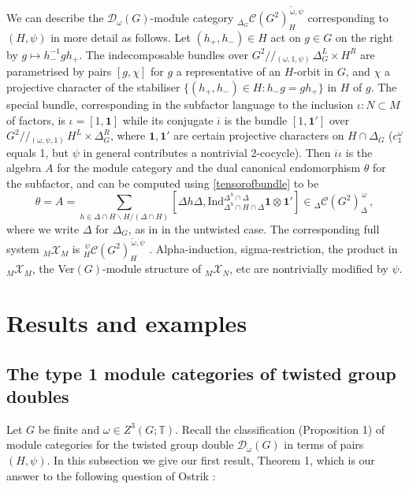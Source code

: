 \documentclass[12pt]{article}
\numberwithin{equation}{section}
\def\cC            {{\mathcal{C}}}
\def\cD            {{\mathcal{D}}}
\def\bbT           {\mathbb{T}}
\def\MXN           {{}_M {\mathcal{X}}_N}
\def\MXM           {{}_M {\mathcal{X}}_M}
\begin{document}
We can describe the $\cD_\omega(G)$-module category 
 ${}_{\Delta_G}\cC(G^2)^{\,\tilde{\omega},\psi}_H$ corresponding to $(H,\psi)$ in more detail as follows.
Let $(h_+,h_-)\in H$ act on $g\in G$ on the right by $g\mapsto h_-^{-1}gh_+$.
The indecomposable bundles over $G^2/\!/\!_{(\omega,1,\psi)} \,\Delta_G^L\times H^R$ are parametrised by
 pairs $[g,\chi]$ for $g$  a representative of an $H$-orbit 
in $G$, and $\chi$ a projective character  of the stabiliser $\{(h_+,h_-)\in H:h_-g=gh_+\}$ in $H$ of 
$g$. The special bundle, corresponding in the subfactor
language to the inclusion $\iota:N\subset M$ of factors, is
$\iota=[1,\mathbf{1}]$ while its conjugate $ \overline{\iota}$ is the bundle $[1,\mathbf{1}']$ over $G^2/\!/\!_{(\omega,\psi,1)} \,H^L\times \Delta_G^R$, where $\mathbf{1},\mathbf{1'}$ are certain 
projective {characters} on $H\cap \Delta_G$ ($c^\omega_1$ equals 1, but $\psi$ in
general contributes a nontrivial 2-cocycle). Then $\overline{\iota}\iota$ is the algebra $A$ for the module category and the dual canonical endomorphism $\theta$ for the subfactor, and
can be computed using \eqref{tensorofbundle} to be
\begin{equation}\label{theta}\theta=A=\sum_{h\in\Delta\cap H\backslash H/(\Delta\cap H)}
\left[\Delta h\Delta,\mathrm{Ind}_{\Delta^h\cap H\cap \Delta}^{\Delta^h\cap\Delta}\mathbf{1}\otimes\mathbf{1}'\right]\in{}_{\Delta}\cC(G^2)^{\,\omega}_\Delta\,,\end{equation}
where we write $\Delta$ for $\Delta_G$, as in \cite{Ev} in the untwisted case. 
The  corresponding full system  $\MXM$ is  ${}_H^{\,\psi}\cC(G^2)_H^{\,\tilde{\omega},\psi}$ \cite{Ev}.  Alpha-induction, sigma-restriction, the product in $\MXM$, the Ver$(G)$-module structure
of $\MXN$, etc are nontrivially modified {by $\psi$}. 





\section{Results and examples}

\subsection{{The type 1 module categories of twisted group doubles}}

Let $G$ be finite {and $\omega\in Z^3(G;\bbT)$. Recall the classification (Proposition 1)
of module categories for the twisted group double $\cD_\omega(G)$ in terms of pairs $(H,\psi)$.} In this subsection we give {our first result,} Theorem 1, which is our answer to  the following question of  Ostrik \cite{Ost}: 
\end{document}
